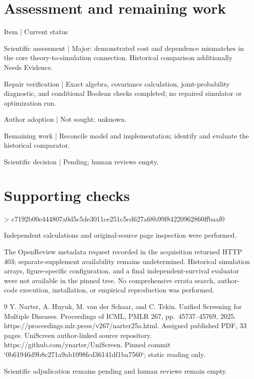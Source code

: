 \documentclass[10pt]{article}
\begin{document}
\section*{Assessment and remaining work}
Item | Current status\par
Scientific assessment | Major: demonstrated cost and dependence mismatches in the core theory-to-simulation connection. Historical comparison additionally Needs Evidence.\par
Repair verification | Exact algebra, covariance calculation, joint-probability diagnostic, and conditional Boolean checks completed; no repaired simulator or optimization run.\par
Author adoption | Not sought; unknown.\par
Remaining work | Reconcile model and implementation; identify and evaluate the historical comparator.\par
Scientific decision | Pending; human reviews empty.\par
\section*{Supporting checks}
> c7192b00e444807a0d5c5de3011ce251c5cd627a68b99f84220962860ffbaaf0\par
Independent calculations and original-source page inspection were performed.\par
The OpenReview metadata request recorded in the acquisition returned HTTP 403; separate-supplement availability remains undetermined. Historical simulation arrays, figure-specific configuration, and a final independent-survival evaluator were not available in the pinned tree. No comprehensive errata search, author-code execution, installation, or empirical reproduction was performed.\par
9 Y. Narter, A. Huyuk, M. van der Schaar, and C. Tekin. Unified Screening for Multiple Diseases. Proceedings of ICML, PMLR 267, pp. 45737–45769, 2025. https://proceedings.mlr.press/v267/narter25a.html. Assigned published PDF, 33 pages. UniScreen author-linked source repository. https://github.com/ynarter/UniScreen. Pinned commit `0b61946d9b8c271a9ab1098fcd36141df1ba7560`; static reading only.\par
Scientific adjudication remains pending and human reviews remain empty.\par
\end{document}
